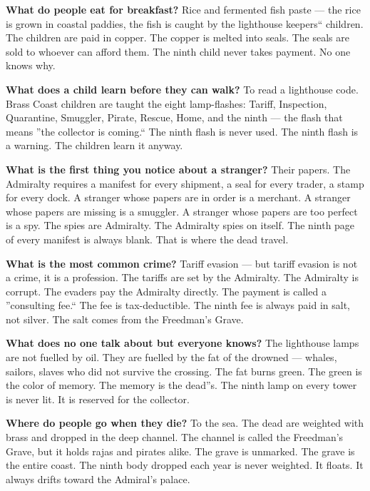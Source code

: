 \vspace{1em}

\begin{almanac}
\textbf{What do people eat for breakfast?} Rice and fermented fish paste --- the rice is grown in coastal paddies, the fish is caught by the lighthouse keepers`` children. The children are paid in copper. The copper is melted into seals. The seals are sold to whoever can afford them. The ninth child never takes payment. No one knows why.

\textbf{What does a child learn before they can walk?} To read a lighthouse code. Brass Coast children are taught the eight lamp-flashes: Tariff, Inspection, Quarantine, Smuggler, Pirate, Rescue, Home, and the ninth --- the flash that means ''the collector is coming.`` The ninth flash is never used. The ninth flash is a warning. The children learn it anyway.

\textbf{What is the first thing you notice about a stranger?} Their papers. The Admiralty requires a manifest for every shipment, a seal for every trader, a stamp for every dock. A stranger whose papers are in order is a merchant. A stranger whose papers are missing is a smuggler. A stranger whose papers are too perfect is a spy. The spies are Admiralty. The Admiralty spies on itself. The ninth page of every manifest is always blank. That is where the dead travel.

\textbf{What is the most common crime?} Tariff evasion --- but tariff evasion is not a crime, it is a profession. The tariffs are set by the Admiralty. The Admiralty is corrupt. The evaders pay the Admiralty directly. The payment is called a ''consulting fee.`` The fee is tax-deductible. The ninth fee is always paid in salt, not silver. The salt comes from the Freedman's Grave.

\textbf{What does no one talk about but everyone knows?} The lighthouse lamps are not fuelled by oil. They are fuelled by the fat of the drowned --- whales, sailors, slaves who did not survive the crossing. The fat burns green. The green is the color of memory. The memory is the dead''s. The ninth lamp on every tower is never lit. It is reserved for the collector.

\textbf{Where do people go when they die?} To the sea. The dead are weighted with brass and dropped in the deep channel. The channel is called the Freedman's Grave, but it holds rajas and pirates alike. The grave is unmarked. The grave is the entire coast. The ninth body dropped each year is never weighted. It floats. It always drifts toward the Admiral's palace.


\end{almanac}
